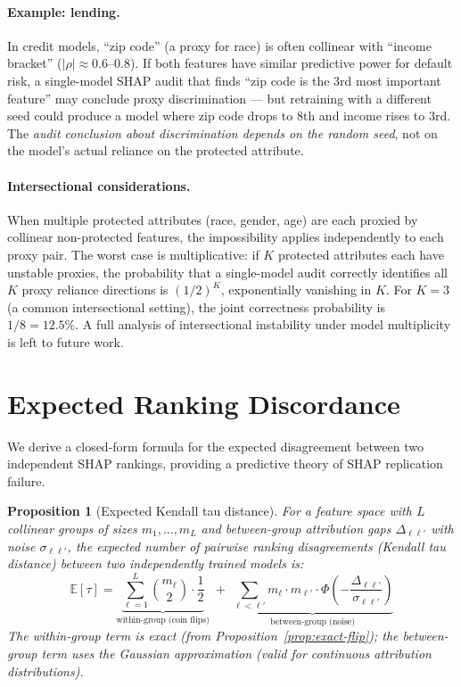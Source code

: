 \documentclass{article}
\newtheorem{proposition}[theorem]{Proposition}
\begin{document}
\paragraph{Example: lending.}
In credit models, ``zip code'' (a proxy for race) is often collinear
with ``income bracket'' ($|\rho| \approx 0.6$--$0.8$). If both
features have similar predictive power for default risk, a
single-model SHAP audit that finds ``zip code is the 3rd most
important feature'' may conclude proxy discrimination --- but
retraining with a different seed could produce a model where
zip code drops to 8th and income rises to 3rd. The \emph{audit
conclusion about discrimination depends on the random seed},
not on the model's actual reliance on the protected attribute.

\paragraph{Intersectional considerations.}
When multiple protected attributes (race, gender, age) are each proxied
by collinear non-protected features, the impossibility applies
independently to each proxy pair. The worst case is multiplicative: if
$K$ protected attributes each have unstable proxies, the probability
that a single-model audit correctly identifies all $K$ proxy reliance
directions is $(1/2)^K$, exponentially vanishing in $K$. For $K = 3$
(a common intersectional setting), the joint correctness probability is
$1/8 = 12.5\%$. A full analysis of intersectional instability under
model multiplicity is left to future work.

\section{Expected Ranking Discordance}

We derive a closed-form formula for the expected disagreement
between two independent SHAP rankings, providing a predictive
theory of SHAP replication failure.

\begin{proposition}[Expected Kendall tau distance]
\label{prop:kendall-tau}
For a feature space with $L$ collinear groups of sizes
$m_1, \ldots, m_L$ and between-group attribution gaps
$\Delta_{\ell\ell'}$ with noise $\sigma_{\ell\ell'}$, the expected
number of pairwise ranking disagreements (Kendall tau distance)
between two independently trained models is:
\begin{equation}
\label{eq:kendall-prediction}
    \mathbb{E}[\tau] =
    \underbrace{\sum_{\ell=1}^{L} \binom{m_\ell}{2} \cdot
    \frac{1}{2}}_{\text{within-group (coin flips)}}
    \;+\;
    \underbrace{\sum_{\ell < \ell'} m_\ell \cdot m_{\ell'} \cdot
    \Phi\!\left(-\frac{\Delta_{\ell\ell'}}
    {\sigma_{\ell\ell'}}\right)}_{\text{between-group (noise)}}
\end{equation}
The within-group term is exact (from
Proposition~\ref{prop:exact-flip}); the between-group term uses the
Gaussian approximation (valid for continuous attribution distributions).
\end{proposition}
\end{document}
